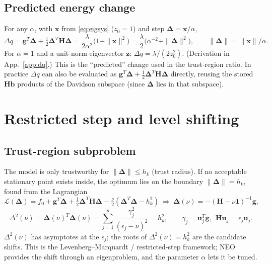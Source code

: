 \documentclass[11pt,a4paper]{article}
\newcommand{\bH}{\mathbf{H}}
\newcommand{\bg}{\mathbf{g}}
\newcommand{\bx}{\mathbf{x}}
\newcommand{\bz}{\mathbf{z}}
\newcommand{\bb}{\mathbf{b}}
\newcommand{\bu}{\mathbf{u}}
\newcommand{\bd}{\boldsymbol{\Delta}}
\newcommand{\bone}{\mathbf{1}}
\begin{document}
\subsection{Predicted energy change}
For any $\alpha$, with $\bx$ from \eqref{eq:eigsys} ($z_0=1$) and step $\bd=\bx/\alpha$,
\begin{equation}
 \Delta q=\bg^T\bd+\tfrac12\bd^T\bH\bd=\frac{\lambda}{2\alpha^2}\big(1+\|\bx\|^2\big)=\frac{\lambda}{2}\big(\alpha^{-2}+\|\bd\|^2\big),\qquad
 \|\bd\|=\|\bx\|/\alpha .\label{eq:dq}
\end{equation}
For $\alpha=1$ and a unit-norm eigenvector $\bz$: $\Delta q=\lambda/(2z_0^2)$. (Derivation in App.~\ref{app:dq}.) This is the ``predicted'' change used in the trust-region ratio.
In practice $\Delta q$ can also be evaluated as $\bg^T\bd+\tfrac12\bd^T\bH\bd$ directly, reusing the stored $\bH\bb$ products of the Davidson subspace (since $\bd$ lies in that subspace).

\section{Restricted step and level shifting}\label{sec:trust}

\subsection{Trust-region subproblem}
The model is only trustworthy for $\|\bd\|\le h_k$ (trust radius). If no acceptable stationary point exists inside, the optimum lies on the boundary $\|\bd\|=h_k$, found from the Lagrangian
\begin{equation}
 \mathcal L(\bd)=f_0+\bg^T\bd+\tfrac12\bd^T\bH\bd-\tfrac{\nu}{2}(\bd^T\bd-h_k^2)\ \Longrightarrow\ 
 \bd(\nu)=-(\bH-\nu\bone)^{-1}\bg,
\end{equation}
\begin{equation}
 \Delta^2(\nu)=\bd(\nu)^T\bd(\nu)=\sum_{j=1}^n\frac{\gamma_j^2}{(\epsilon_j-\nu)^2}=h_k^2,\qquad \gamma_j=\bu_j^T\bg,\ \ \bH\bu_j=\epsilon_j\bu_j. \label{eq:steplen}
\end{equation}
$\Delta^2(\nu)$ has asymptotes at the $\epsilon_j$; the roots of $\Delta^2(\nu)=h_k^2$ are the candidate shifts. This is the Levenberg--Marquardt / restricted-step framework; NEO provides the shift through an eigenproblem, and the parameter $\alpha$ lets it be tuned.
\end{document}
